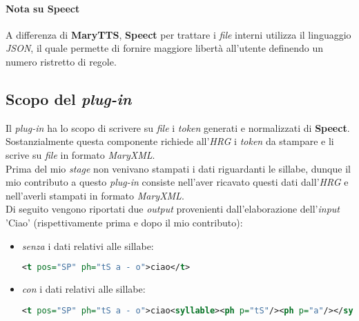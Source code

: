                   \paragraph{Nota su Speect} A differenza di \textbf{MaryTTS}, \textbf{Speect} per trattare
                  i \textit{file} interni utilizza il linguaggio \textit{JSON}, il quale permette di fornire
                  maggiore libertà all'utente definendo un numero ristretto di regole.
         \subsection{Scopo del \textit{plug-in}}
             Il \textit{plug-in} ha lo scopo di scrivere su \textit{file} i \textit{token} generati e normalizzati
             di \textbf{Speect}. \\
             Sostanzialmente questa componente richiede all'\textit{HRG} i \textit{token} da stampare e li scrive su \textit{file} 
             in formato \textit{MaryXML}. \\
             Prima del mio \textit{stage} non venivano stampati i dati riguardanti le sillabe, dunque il mio contributo
             a questo \textit{plug-in} consiste nell'aver ricavato questi dati dall'\textit{HRG} e nell'averli stampati
             in formato \textit{MaryXML}. \\
             Di seguito vengono riportati due \textit{output} provenienti dall'elaborazione dell'\textit{input} 'Ciao' 
             (rispettivamente prima e dopo il mio contributo):
             \begin{itemize}
               \item \textit{senza} i dati relativi alle sillabe: \\
                 \begin{lstlisting}[language=XML] 
                   <t pos="SP" ph="tS a - o">ciao</t> 
                 \end{lstlisting}
               \item \textit{con} i dati relativi alle sillabe: \\
                 \begin{lstlisting}[language=XML] 
                   <t pos="SP" ph="tS a - o">ciao<syllable><ph p="tS"/><ph p="a"/></syllable><syllable><ph p="o"/></syllable></t>
                 \end{lstlisting}
             \end{itemize}

